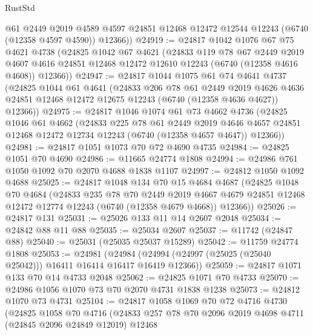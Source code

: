 \begin{lexlean}{RustStd}
\begin{coremodule}
        @61
        @2449
        @2019
        @4589
        @4597
        @24851
        @12468
        @12472
        @12544
        @12243
        (@6740 (@12358 @4597 @4590))
        @12366))
@24919 := @24817
    @1042
    @1076
    @67
    @75
    @4621
    @4738
    (@24825
      @1042
      @67
      @4621
      (@24833
        @119
        @78
        @67
        @2449
        @2019
        @4607
        @4616
        @24851
        @12468
        @12472
        @12610
        @12243
        (@6740 (@12358 @4616 @4608))
        @12366))
@24947 := @24817
    @1044
    @1075
    @61
    @74
    @4641
    @4737
    (@24825
      @1044
      @61
      @4641
      (@24833
        @206
        @78
        @61
        @2449
        @2019
        @4626
        @4636
        @24851
        @12468
        @12472
        @12675
        @12243
        (@6740 (@12358 @4636 @4627))
        @12366))
@24975 := @24817
    @1046
    @1074
    @61
    @73
    @4662
    @4736
    (@24825
      @1046
      @61
      @4662
      (@24833
        @225
        @78
        @61
        @2449
        @2019
        @4646
        @4657
        @24851
        @12468
        @12472
        @12734
        @12243
        (@6740 (@12358 @4657 @4647))
        @12366))
@24981 := @24817 @1051 @1073 @70 @72 @4690 @4735
@24984 := @24825 @1051 @70 @4690
@24986 := @11665 @24774 @1808
@24994 := @24986 @761 @1050 @1092 @70 @2070 @4688 @1838 @1107
@24997 := @24812 @1050 @1092 @4688
@25025 := @24817
    @1048
    @134
    @70
    @15
    @4684
    @4687
    (@24825
      @1048
      @70
      @4684
      (@24833
        @235
        @78
        @70
        @2449
        @2019
        @4667
        @4679
        @24851
        @12468
        @12472
        @12774
        @12243
        (@6740 (@12358 @4679 @4668))
        @12366))
@25026 := @24817 @131
@25031 := @25026 @133 @11 @14 @2607 @2048
@25034 := @24842 @88 @11 @88
@25035 := @25034 @2607
@25037 := @11742 (@24847 @88)
@25040 := @25031 (@25035 @25037 @15289)
@25042 := @11759 @24774 @1808
@25053 := @24981
    (@24984 (@24994 (@24997 (@25025 (@25040 @25042))) @16411 @16414 @16417 @16419 @12366))
@25059 := @24817 @1071 @133 @70 @14 @4733 @2048
@25062 := @24825 @1071 @70 @4733
@25070 := @24986 @1056 @1070 @73 @70 @2070 @4731 @1838 @1238
@25073 := @24812 @1070 @73 @4731
@25104 := @24817
    @1058
    @1069
    @70
    @72
    @4716
    @4730
    (@24825
      @1058
      @70
      @4716
      (@24833
        @257
        @78
        @70
        @2096
        @2019
        @4698
        @4711
        (@24845 @2096 @24849 @12019)
        @12468

\end{coremodule}
\end{lexlean}
